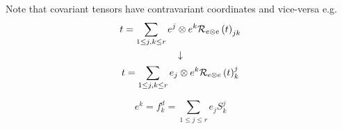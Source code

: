 \begin{remark}
Note that covariant tensors have contravariant coordinates and vice-versa
e.g. 
\begin{gather}
t=\sum_{1\leq j,k\leq r}e^{j}\otimes e^{k}{\cal R}_{e\otimes e}\left(
t\right) _{jk} \\
{\Large \downarrow } \\
t=\sum_{1\leq j,k\leq r}e_{j}\otimes e^{k}{\cal R}_{e\otimes e}\left(
t\right) _{k}^{j}
\end{gather}
\end{remark}

\begin{remark}
\begin{equation}
e^{k}=f_{k}^{d}=\sum_{1\leq j\leq r}e_{j}S_{k}^{j}
\end{equation}
\end{remark}

